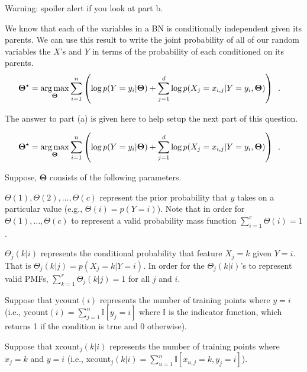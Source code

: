 \documentclass[assignment03_Solutions]{subfiles}
\begin{document}
\begin{exercise}[(60 minutes)]
Warning: spoiler alert if you look at part b.
\begin{boxedsolution}
We know that each of the variables in a BN is conditionally independent given its parents.  We can use this result to write the joint probability of all of our random variables the $X$'s and $Y$ in terms of the probability of each conditioned on its parents.
\begin{align}
\mathbf{\Theta^\star} &= \operatorname*{arg\,max}_{\mathbf{\Theta}} \sum_{i=1}^n  \left ( \log p(Y = y_i | \mathbf{\Theta})  + \sum_{j=1}^d \log p(X_j = x_{i,j} | Y = y_i,  \mathbf{\Theta}) \right ) \enspace . \label{eq:nbmle}
\end{align}
\end{boxedsolution}

\item The answer to part (a) is given here to help setup the next part of this question.

\begin{align}
\mathbf{\Theta^\star} &= \operatorname*{arg\,max}_{\mathbf{\Theta}} \sum_{i=1}^n  \left ( \log p(Y = y_i  | \mathbf{\Theta})  + \sum_{j=1}^d \log p(X_j = x_{i,j} | Y = y_i,  \mathbf{\Theta}) \right ) \enspace . \label{eq:nbmle}
\end{align}

Suppose, $\mathbf{\Theta}$ consists of the following parameters.
\bi
\item $\Theta(1), \Theta(2), \ldots, \Theta(c)$ represent the prior probability that $y$ takes on a particular value (e.g., $\Theta(i) = p(Y = i)$).  Note that in order for $\Theta(1), \ldots, \Theta(c)$ to represent a valid probability mass function $\sum_{i=1}^c \Theta(i) = 1$.
\item $\Theta_{j}(k | i)$ represents the conditional probability that feature $X_j = k$ given $Y = i$.  That is $\Theta_{j}(k | j) = p(X_j = k | Y = i)$.  In order for the $\Theta_j(k|i)$'s to represent valid PMFs, $\sum_{k=1}^{r} \Theta_{j}(k | j) = 1$ for all $j$ and $i$.
\ei

Suppose that $\mbox{ycount}(i)$ represents the number of training points where $y = i$ (i.e., $\mbox{ycount}(i) = \sum_{j=1}^n \mathbb{I} \left [y_j = i \right]$ where $\mathbb{I}$ is the indicator function, which returns 1 if the condition is true and 0 otherwise).

Suppose that $\mbox{xcount}_j(k|i)$ represents the number of training points where $x_j = k$ and $y = i$ (i.e., $\mbox{xcount}_j (k|i) = \sum_{u=1}^n \mathbb{I} \left [ x_{u, j} = k, y_j = i \right ]$).


\end{exercise}
\end{document}

